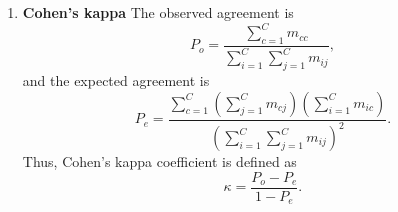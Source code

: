 \documentclass[anonymous]{iopjournal}
\begin{document}
\begin{enumerate}
	\item \textbf{Cohen’s kappa}
	The observed agreement is
	\begin{equation}
		P_o =
		\frac{\sum_{c=1}^{C} m_{cc}}
		{\sum_{i=1}^{C}\sum_{j=1}^{C} m_{ij}},
	\end{equation}
	and the expected agreement is
	\begin{equation}
		P_e =
		\frac{\sum_{c=1}^{C}
			\left(\sum_{j=1}^{C} m_{cj}\right)
			\left(\sum_{i=1}^{C} m_{ic}\right)}
		{\left(\sum_{i=1}^{C}\sum_{j=1}^{C} m_{ij}\right)^2}.
	\end{equation}
	Thus, Cohen’s kappa coefficient is defined as
	\begin{equation}
		\kappa =
		\frac{P_o - P_e}{1 - P_e}.
	\end{equation}
\end{enumerate}
\end{document}
